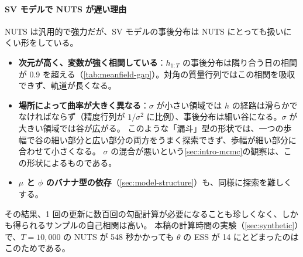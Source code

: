 \paragraph{SV モデルで NUTS が遅い理由}
NUTS は汎用的で強力だが、SV モデルの事後分布は NUTS にとっても扱いにくい形をしている。
\begin{itemize}
  \item \textbf{次元が高く、変数が強く相関している}：$h_{1:T}$ の事後分布は隣り合う日の相関が 0.9 を超える（\cref{tab:meanfield-gap}）。対角の質量行列ではこの相関を吸収できず、軌道が長くなる。
  \item \textbf{場所によって曲率が大きく異なる}：$\sigma$ が小さい領域では $h$ の経路は滑らかでなければならず（精度行列が $1/\sigma^2$ に比例）、事後分布は細い谷になる。$\sigma$ が大きい領域では谷が広がる。
    このような「漏斗」型の形状では、一つの歩幅で谷の細い部分と広い部分の両方をうまく探索できず、歩幅が細い部分に合わせて小さくなる。
    $\sigma$ の混合が悪いという\cref{sec:intro-mcmc}の観察は、この形状によるものである。
  \item \textbf{$\mu$ と $\phi$ のバナナ型の依存}（\cref{sec:model-structure}）も、同様に探索を難しくする。
\end{itemize}
その結果、1 回の更新に数百回の勾配計算が必要になることも珍しくなく、しかも得られるサンプルの自己相関は高い。
本稿の計算時間の実験（\cref{sec:synthetic}）で、$T = 10{,}000$ の NUTS が 548 秒かかっても $\theta$ の ESS が 14 にとどまったのはこのためである。

